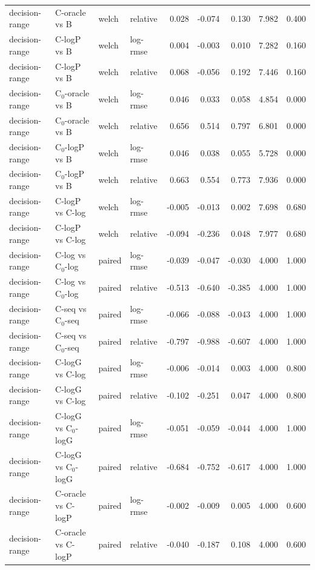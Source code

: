 \begin{longtable}{llllrrrrr}
decision-range & C-oracle vs B & welch & relative & 0.028 & -0.074 & 0.130 & 7.982 & 0.400 \\
decision-range & C-logP vs B & welch & log-rmse & 0.004 & -0.003 & 0.010 & 7.282 & 0.160 \\
decision-range & C-logP vs B & welch & relative & 0.068 & -0.056 & 0.192 & 7.446 & 0.160 \\
decision-range & C$_0$-oracle vs B & welch & log-rmse & 0.046 & 0.033 & 0.058 & 4.854 & 0.000 \\
decision-range & C$_0$-oracle vs B & welch & relative & 0.656 & 0.514 & 0.797 & 6.801 & 0.000 \\
decision-range & C$_0$-logP vs B & welch & log-rmse & 0.046 & 0.038 & 0.055 & 5.728 & 0.000 \\
decision-range & C$_0$-logP vs B & welch & relative & 0.663 & 0.554 & 0.773 & 7.936 & 0.000 \\
decision-range & C-logP vs C-log & welch & log-rmse & -0.005 & -0.013 & 0.002 & 7.698 & 0.680 \\
decision-range & C-logP vs C-log & welch & relative & -0.094 & -0.236 & 0.048 & 7.977 & 0.680 \\
decision-range & C-log vs C$_0$-log & paired & log-rmse & -0.039 & -0.047 & -0.030 & 4.000 & 1.000 \\
decision-range & C-log vs C$_0$-log & paired & relative & -0.513 & -0.640 & -0.385 & 4.000 & 1.000 \\
decision-range & C-seq vs C$_0$-seq & paired & log-rmse & -0.066 & -0.088 & -0.043 & 4.000 & 1.000 \\
decision-range & C-seq vs C$_0$-seq & paired & relative & -0.797 & -0.988 & -0.607 & 4.000 & 1.000 \\
decision-range & C-logG vs C-log & paired & log-rmse & -0.006 & -0.014 & 0.003 & 4.000 & 0.800 \\
decision-range & C-logG vs C-log & paired & relative & -0.102 & -0.251 & 0.047 & 4.000 & 0.800 \\
decision-range & C-logG vs C$_0$-logG & paired & log-rmse & -0.051 & -0.059 & -0.044 & 4.000 & 1.000 \\
decision-range & C-logG vs C$_0$-logG & paired & relative & -0.684 & -0.752 & -0.617 & 4.000 & 1.000 \\
decision-range & C-oracle vs C-logP & paired & log-rmse & -0.002 & -0.009 & 0.005 & 4.000 & 0.600 \\
decision-range & C-oracle vs C-logP & paired & relative & -0.040 & -0.187 & 0.108 & 4.000 & 0.600 \\

\end{longtable}
